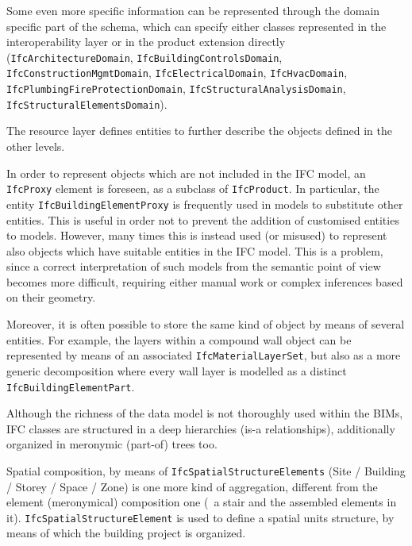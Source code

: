 Some even more specific information can be represented through the domain specific part of the schema, which can specify either classes represented in the interoperability layer or in the product extension directly (\texttt{IfcArchitectureDomain}, \texttt{IfcBuildingControlsDomain}, \texttt{Ifc\-Cons\-truc\-tion\-Mgmt\-Do\-main}, \texttt{IfcElectricalDomain}, \texttt{IfcHvacDomain}, \texttt{Ifc\-Plum\-bing\-Fire\-Pro\-tec\-tion\-Do\-main}, \texttt{Ifc\-Struc\-tu\-ral\-A\-na\-ly\-sis\-Do\-main}, \texttt{Ifc\-Struc\-tu\-ral\-E\-le\-ments\-Do\-main}).

The resource layer defines entities to further describe the objects defined in the other levels.

In order to represent objects which are not included in the IFC model, an \texttt{IfcProxy} element is foreseen, as a subclass of \texttt{IfcProduct}.
In particular, the entity \texttt{IfcBuildingElementProxy} is frequently used in models to substitute other entities.
This is useful in order not to prevent the addition of customised entities to models. However, many times this is instead used (or misused) to represent also objects which have suitable entities in the IFC model.
This is a problem, since a correct interpretation of such models from the semantic point of view becomes more difficult, requiring either manual work or complex inferences based on their geometry.

Moreover, it is often possible to store the same kind of object by means of several entities.
For example, the layers within a compound wall object can be represented by means of an associated \texttt{IfcMaterialLayerSet}, but also as a more generic decomposition where every wall layer is modelled as a distinct \texttt{IfcBuildingElementPart}.

Although the richness of the data model is not thoroughly used within the BIMs,
IFC classes are structured in a deep hierarchies (is-a relationships), additionally organized in
meronymic (part-of) trees too.

Spatial composition, by means of \texttt{IfcSpatialStructureElements} (Site / Building / Storey / Space / Zone) is one more kind of aggregation, different from the element (meronymical) composition one (\eg\ a stair and the assembled elements in it).
\texttt{IfcSpatialStructureElement} is used to define a spatial units structure, by means of which the building project is organized.

